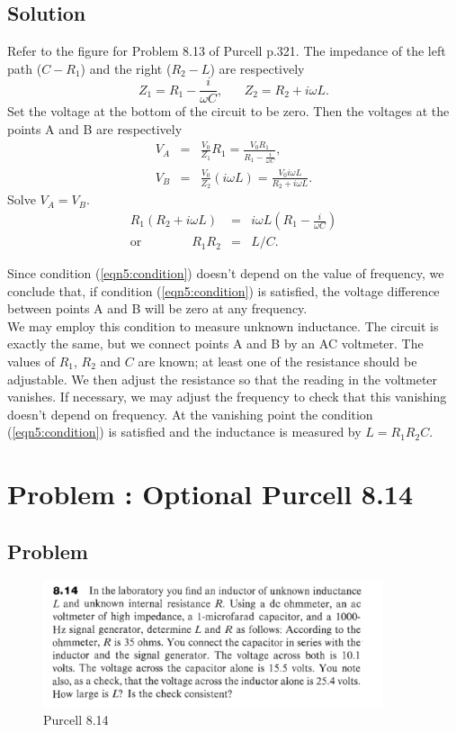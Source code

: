 \documentclass[solutions]{esg8022pset}
\begin{document}
\subsection{Solution}
Refer to the figure for Problem 8.13 of Purcell p.321.  The impedance
of the left path ($C-R_1$) and the right ($R_2 - L$) are respectively
\[Z_1=R_1-\frac{i}{\omega C},\;\;\;\;\;\; Z_2=R_2+i\omega L.\]
Set the voltage at the bottom of the circuit to be zero.  Then the
voltages at the points A and B are respectively
\begin{eqnarray}
V_A &=& \frac{V_0}{Z_1} R_1= \frac{V_0 R_1}{R_1-\frac{i}{\omega
C}},\nonumber\\
V_B &=& \frac{V_0}{Z_2} (i\omega L)=\frac{V_0 i\omega L}{R_2+i\omega L}.
\end{eqnarray}
Solve $V_A=V_B$.
\begin{eqnarray}
R_1(R_2+i\omega L) &=& i\omega L (R_1-\frac{i}{\omega C})\nonumber\\
\textrm{or}\qquad\qquad R_1 R_2 &=& L/C.\label{eqn5:condition}
\end{eqnarray}

Since condition (\ref{eqn5:condition}) doesn't depend on the value of
frequency, we conclude that, if condition (\ref{eqn5:condition}) is
satisfied, the voltage difference between points A and B will be zero
at any frequency.\\

We may employ this condition to measure unknown inductance.  The
circuit is exactly the same, but we connect points A and B by an AC
voltmeter.  The values of $R_1$, $R_2$ and $C$ are known; at least one
of the resistance should be adjustable.  We then adjust the resistance
so that the reading in the voltmeter vanishes.  If necessary, we may
adjust the frequency to check that this vanishing doesn't depend on
frequency.  At the vanishing point the condition
(\ref{eqn5:condition}) is satisfied and the inductance is measured by
$L=R_1 R_2 C$.

\section{Problem \thesection: Optional Purcell 8.14}
\subsection{Problem}
\begin{figure}[H]
    \centering
    \includegraphics[width = 10cm]{pu814}
    \caption{Purcell 8.14}
  \end{figure}
\end{document}
